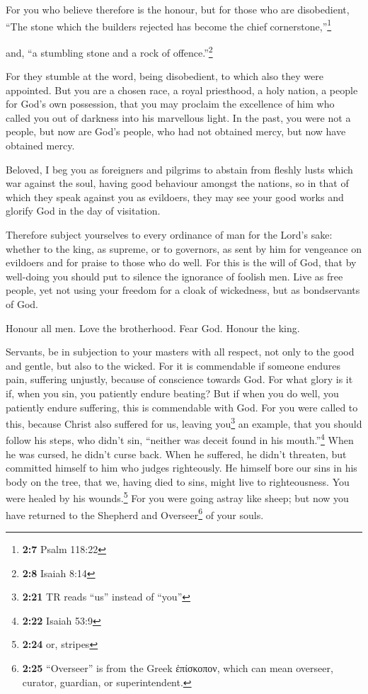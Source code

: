  For you who believe therefore is the honour, but for
those who are disobedient, ``The stone which the builders rejected has
become the chief cornerstone,''\footnote{\textbf{2:7} Psalm 118:22}

 and, ``a stumbling stone and a rock of
offence.''\footnote{\textbf{2:8} Isaiah 8:14}

For they stumble at the word, being disobedient, to which also they were
appointed.  But you are a chosen race, a royal priesthood,
a holy nation, a people for God's own possession, that you may proclaim
the excellence of him who called you out of darkness into his marvellous
light.  In the past, you were not a people, but now are
God's people, who had not obtained mercy, but now have obtained mercy.

 Beloved, I beg you as foreigners and pilgrims to abstain
from fleshly lusts which war against the soul,  having
good behaviour amongst the nations, so in that of which they speak
against you as evildoers, they may see your good works and glorify God
in the day of visitation.

 Therefore subject yourselves to every ordinance of man
for the Lord's sake: whether to the king, as supreme,  or
to governors, as sent by him for vengeance on evildoers and for praise
to those who do well.  For this is the will of God, that
by well-doing you should put to silence the ignorance of foolish men.
 Live as free people, yet not using your freedom for a
cloak of wickedness, but as bondservants of God.

 Honour all men. Love the brotherhood. Fear God. Honour
the king.

 Servants, be in subjection to your masters with all
respect, not only to the good and gentle, but also to the wicked.
 For it is commendable if someone endures pain, suffering
unjustly, because of conscience towards God.  For what
glory is it if, when you sin, you patiently endure beating? But if when
you do well, you patiently endure suffering, this is commendable with
God.  For you were called to this, because Christ also
suffered for us, leaving you\footnote{\textbf{2:21} TR reads ``us''
  instead of ``you''} an example, that you should follow his steps,
 who didn't sin, ``neither was deceit found in his
mouth.''\footnote{\textbf{2:22} Isaiah 53:9}  When he was
cursed, he didn't curse back. When he suffered, he didn't threaten, but
committed himself to him who judges righteously.  He
himself bore our sins in his body on the tree, that we, having died to
sins, might live to righteousness. You were healed by his
wounds.\footnote{\textbf{2:24} or, stripes}  For you were
going astray like sheep; but now you have returned to the Shepherd and
Overseer\footnote{\textbf{2:25} ``Overseer'' is from the Greek
  ἐπίσκοπον, which can mean overseer, curator, guardian, or
  superintendent.} of your souls.

